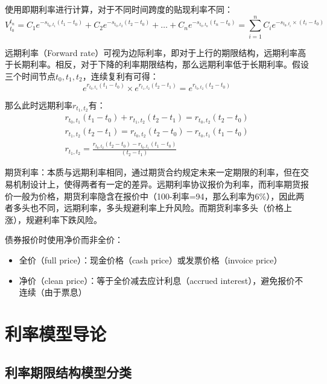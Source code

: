 \documentclass[11pt]{article}
\begin{document}
使用即期利率进行计算，对于不同时间跨度的贴现利率不同：
\begin{equation*}
    V_{t_0}^{t_n} = C_1 e^{-s_{t_0,t_1}(t_1-t_0)} + C_2 e^{-s_{t_0,t_2}(t_2-t_0)}
    + \dots + C_n e^{-s_{t_0,t_n}(t_n-t_0)}
    = \sum_{i=1}^{n} C_i e^{-s_{t_0,t_i}\times (t_i-t_0)}
\end{equation*}

远期利率（Forward rate）可视为边际利率，即对于上行的期限结构，远期利率高于长期利率。相反，对于下降的利率期限结构，那么远期利率低于长期利率。假设三个时间节点$t_0,t_1,t_2$，连续复利有可得：
\begin{equation*}
    e^{r_{t_0,t_1}(t_1-t_0)} \times e^{r_{t_1,t_2}(t_2-t_1)} = e^{r_{t_0,t_2}(t_2-t_0)}
\end{equation*}

那么此时远期利率$r_{t_1,t_2}$有：
\begin{gather*}
    r_{t_0,t_1}(t_1-t_0) + r_{t_1,t_2}(t_2-t_1) = r_{t_0,t_2}(t_2-t_0) \\
    r_{t_1,t_2}(t_2-t_1) = r_{t_0,t_2}(t_2-t_0) - r_{t_0,t_1}(t_1-t_0) \\
    r_{t_1,t_2} = \frac{r_{t_0,t_2}(t_2-t_0) - r_{t_0,t_1}(t_1-t_0)}{(t_2-t_1)}
\end{gather*}

期货利率：本质与远期利率相同，通过期货合约规定未来一定期限的利率，但在交易机制设计上，使得两者有一定的差异。远期利率协议报价为利率，而利率期货报价一般为价格，期货利率隐含在报价中（100-利率=94，那么利率为6\%），因此两者多头也不同，远期利率，多头规避利率上升风险。而期货利率多头（价格上涨），规避利率下跌风险。

债券报价时使用净价而非全价：
\begin{itemize}
    \item 全价（full price）：现金价格（cash price）或发票价格（invoice price）
    \item 净价（clean price）：等于全价减去应计利息（accrued interest），避免报价不连续（由于票息）
\end{itemize}

\section{利率模型导论}

\subsection{利率期限结构模型分类}
\end{document}
